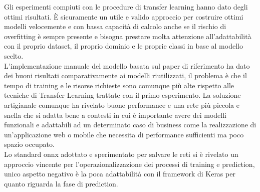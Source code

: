 Gli esperimenti compiuti con le procedure di transfer learning hanno dato degli ottimi risultati. È sicuramente un utile e valido approccio per costruire ottimi modelli velocemente e con bassa capacità di calcolo anche se il rischio di overfitting è sempre presente e bisogna prestare molta attenzione all'adattabilità con il proprio dataset, il proprio dominio e le proprie classi in base al modello scelto. \\
L'implementazione manuale del modello basata sul paper di riferimento ha dato dei buoni risultati comparativamente ai modelli riutilizzati, il problema è che il tempo di training e le risorse richieste sono comunque più alte rispetto alle tecniche di Transfer Learning trattate con il primo esperimento.
La soluzione artigianale comunque ha rivelato buone performance e una rete più piccola e snella che si adatta bene a contesti in cui è importante avere dei modelli funzionali e adattabili ad un determinato caso di business come la realizzazione di un'applicazione web o mobile che necessita di performance sufficienti ma poco spazio occupato. \\
Lo standard onnx adottato e sperimentato per salvare le reti si è rivelato un approccio vincente per l'operazionalizzazione dei processi di training e prediction, unico aspetto negativo è la poca adattabilità con il framework di Keras per quanto riguarda la fase di prediction.





